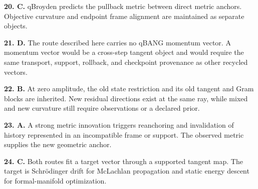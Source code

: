 \documentclass[10pt,twocolumn]{article}
\begin{document}
\textbf{20. C.} qBroyden predicts the pullback metric between direct metric
anchors. Objective curvature and endpoint frame alignment are maintained as
separate objects.

\textbf{21. D.} The route described here carries no qBANG momentum vector. A
momentum vector would be a cross-step tangent object and would require the same
transport, support, rollback, and checkpoint provenance as other recycled
vectors.

\newpage
\textbf{22. B.} At zero amplitude, the old state restriction and its old
tangent and Gram blocks are inherited. New residual directions exist at the
same ray, while mixed and new curvature still require observations or a
declared prior.

\textbf{23. A.} A strong metric innovation triggers reanchoring and
invalidation of history represented in an incompatible frame or support. The
observed metric supplies the new geometric anchor.

\textbf{24. C.} Both routes fit a target vector through a supported tangent
map. The target is Schr\"odinger drift for McLachlan propagation and static
energy descent for formal-manifold optimization.
\end{document}
